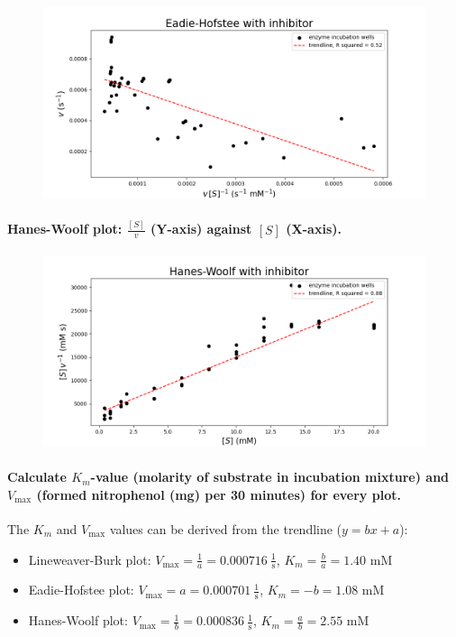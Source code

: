 \documentclass[a4paper,12pt]{article}
\begin{document}
\begin{figure}[htb]
    \includegraphics[scale=0.4]{fig3_3.png}
    \centering
\end{figure}

\paragraph{Hanes-Woolf plot: $\frac{[S]}{v}$ (Y-axis) against $[S]$ (X-axis).}

\begin{figure}[htb]
    \includegraphics[scale=0.4]{fig3_4.png}
    \centering
\end{figure}

\paragraph{Calculate $K_m$-value (molarity of substrate in incubation mixture) and $V_{\text{max}}$ (formed nitrophenol (mg) per 30 minutes) for every plot.}

The $K_m$ and $V_{\text{max}}$ values can be derived from the trendline ($y = bx+a$):
\begin{itemize}
\item Lineweaver-Burk plot: $V_{\text{max}} = \frac{1}{a} = 0.000716\: \frac{1}{\text{s}}$, $K_m = \frac{b}{a} = 1.40$ mM
\item Eadie-Hofstee plot: $V_{\text{max}} = a = 0.000701\: \frac{1}{\text{s}}$, $K_m = -b = 1.08$ mM
\item Hanes-Woolf plot: $V_{\text{max}} = \frac{1}{b} = 0.000836\: \frac{1}{\text{s}}$, $K_m = \frac{a}{b} = 2.55$ mM
\end{itemize}
\end{document}
